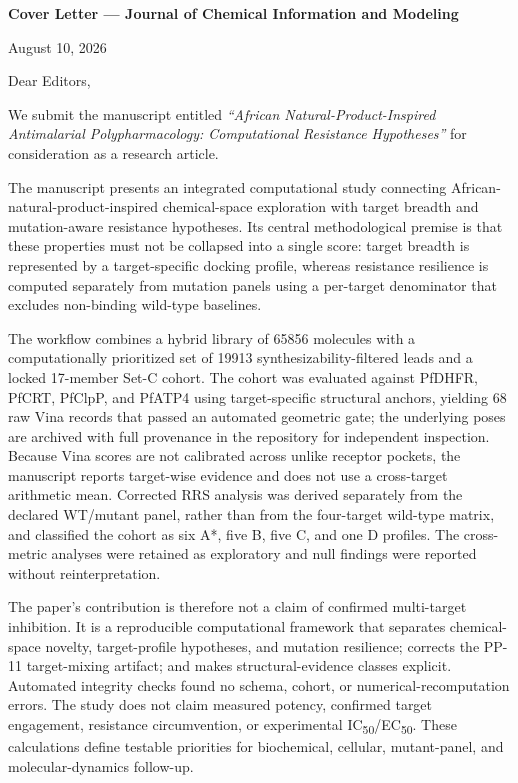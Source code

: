 \documentclass[11pt]{article}
\begin{document}
\noindent\textbf{Cover Letter — Journal of Chemical Information and Modeling}

\vspace{1em}
\noindent August 10, 2026

\vspace{1em}
Dear Editors,

We submit the manuscript entitled \textit{“African Natural-Product-Inspired Antimalarial Polypharmacology: Computational Resistance Hypotheses”} for consideration as a research article.

The manuscript presents an integrated computational study connecting African-natural-product-inspired chemical-space exploration with target breadth and mutation-aware resistance hypotheses. Its central methodological premise is that these properties must not be collapsed into a single score: target breadth is represented by a target-specific docking profile, whereas resistance resilience is computed separately from mutation panels using a per-target denominator that excludes non-binding wild-type baselines.

The workflow combines a hybrid library of \num{65856} molecules with a computationally prioritized set of \num{19913} synthesizability-filtered leads and a locked \num{17}-member Set-C cohort. The cohort was evaluated against PfDHFR, PfCRT, PfClpP, and PfATP4 using target-specific structural anchors, yielding \num{68} raw Vina records that passed an automated geometric gate; the underlying poses are archived with full provenance in the repository for independent inspection. Because Vina scores are not calibrated across unlike receptor pockets, the manuscript reports target-wise evidence and does not use a cross-target arithmetic mean. Corrected RRS analysis was derived separately from the declared WT/mutant panel, rather than from the four-target wild-type matrix, and classified the cohort as six A*, five B, five C, and one D profiles. The cross-metric analyses were retained as exploratory and null findings were reported without reinterpretation.

The paper’s contribution is therefore not a claim of confirmed multi-target inhibition. It is a reproducible computational framework that separates chemical-space novelty, target-profile hypotheses, and mutation resilience; corrects the PP-11 target-mixing artifact; and makes structural-evidence classes explicit. Automated integrity checks found no schema, cohort, or numerical-recomputation errors. The study does not claim measured potency, confirmed target engagement, resistance circumvention, or experimental IC\textsubscript{50}/EC\textsubscript{50}. These calculations define testable priorities for biochemical, cellular, mutant-panel, and molecular-dynamics follow-up.
\end{document}

